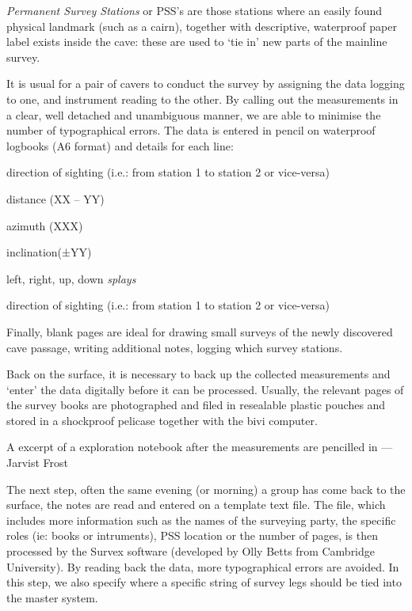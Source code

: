  \emph{Permanent Survey Stations} or PSS's are those stations where an easily found physical landmark (such as a cairn), together with descriptive, waterproof paper label exists inside the cave: these are used to `tie in' new parts of the mainline survey.

It is usual for a pair of cavers to conduct the survey by assigning the data logging to one, and instrument reading to the other. By calling out the measurements in a clear, well detached and unambiguous manner, we are able to minimise the number of typographical errors. The data is entered in pencil on waterproof logbooks (A6 format) and details for each line:

\begin{citemize}
\item direction of sighting (i.e.: from station 1 to station 2 or vice-versa)
\item distance (XX – YY)
\item azimuth (XXX)
\item inclination(±YY)
\item left, right, up, down \emph{splays}
\item direction of sighting (i.e.: from station 1 to station 2 or vice-versa)
\end{citemize}

Finally, blank pages are ideal for drawing small surveys of the newly discovered cave passage, writing additional notes, logging which survey stations.

Back on the surface, it is necessary to back up the collected measurements and `enter' the data digitally before it can be processed. Usually, the relevant pages of the survey books are photographed and filed in resealable plastic pouches and stored in a shockproof pelicase together with the bivi computer. 

\begin{marginfigure}
\checkoddpage \ifoddpage \forcerectofloat \else \forceversofloat \fi
\centering
 \caption{A excerpt of a exploration notebook after the measurements are pencilled in ---Jarvist Frost}
 \label{notebook}
\end{marginfigure}

The next step, often the same evening (or morning) a group has come back to the surface, the notes are read and entered on a template text file. The file, which includes more information such as the names of the surveying party, the specific roles (ie: books or intruments), PSS location or the number of pages, is then processed by the Survex software (developed by Olly Betts from Cambridge University). By reading back the data, more typographical errors are avoided. In this step, we also specify where a specific string of survey legs should be tied into the master system. 

